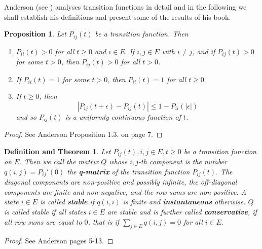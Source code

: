 \documentclass[12pt,a4paper]{scrartcl}
\newtheorem{proposition}[theorem]{Proposition}
\newtheorem{definitionandtheorem}[theorem]{Definition and Theorem}
\numberwithin{equation}{section}
\begin{document}
Anderson (see \cite{anderson}) analyses transition functions in detail and in the following we shall establish his definitions and present some of the results of his book. 

\begin{proposition} \label{th:transfcont}
Let $P_{ij}\left(t\right)$ be a transition function. Then
\begin{enumerate}[(1)]
\item $P_{ii}\left(t\right) > 0 $ for all $t \geq 0$ and $i \in E.$ If $i,j \in E$ with $i \neq j$, and if $P_{ij}\left(t\right) > 0$ for some $t >0$, then $P_{ij}\left(t\right) > 0$ for all $t > 0$.
\item If $P_{ii}\left(t\right) = 1$ for some $t >0$, then $P_{ii}\left(t\right) = 1$ for all $t\geq 0.$
\item If $t \geq 0$, then
$$ \left|P_{ij}\left(t+\epsilon \right) - P_{ij}\left(t\right) \right| \leq  1 - P_{ii}\left(\left|\epsilon\right| \right)$$
and so $P_{ij}\left(t\right)$ is a uniformly continuous function of $t$.
\end{enumerate}
\end{proposition}
\begin{proof}
See Anderson \cite{anderson} Proposition 1.3. on page 7.
\end{proof}

\begin{definitionandtheorem} \label{th:defqmatrixoftransitionfunction}
Let $P_{ij}\left(t\right), i,j \in E, t\geq 0$ be a transition function on $E$. Then we call the matrix $Q$ whose $i,j$-th component is the number $q\left(i,j\right) = P_{ij}'\left(0\right)$ the \textbf{q-matrix} of the transition function $P_{ij}\left(t\right).$ The diagonal components are non-positive and possibly infinite, the off-diagonal components are finite and non-negative, and the row sums are non-positive. A state $i \in E$ is called \textbf{stable} if $q\left(i,i\right)$ is finite and \textbf{instantaneous} otherwise. $Q$ is called stable if all states $i \in E$ are stable and is further called \textbf{conservative}, if all row sums are equal to $0$, that is if $\sum_{j \in E} q\left(i,j\right) = 0$ for all $i \in E.$
\end{definitionandtheorem}
\begin{proof}
See Anderson \cite{anderson} pages 5-13.
\end{proof}
\end{document}
